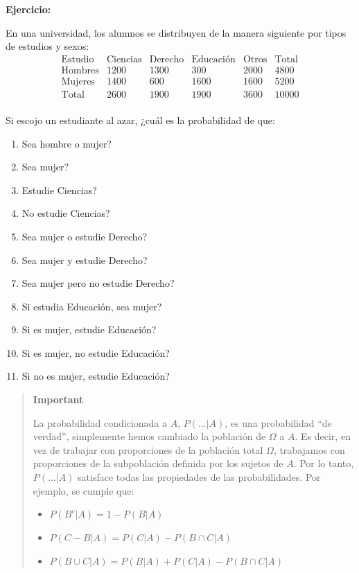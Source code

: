 \documentclass[
  spanish,
  letterpaper,
  DIV=11,
  numbers=noendperiod]{scrreprt}
\providecommand{\tightlist}{%
  \setlength{\itemsep}{0pt}\setlength{\parskip}{0pt}}
\begin{document}
\begin{tcolorbox}
\textbf{Ejercicio:}

En una universidad, los alumnos se distribuyen de la manera siguiente
por tipos de estudios y sexos: \[
\begin{array}{r|c|c|c|c|c}
\text{Estudio} & \text{Ciencias} & \text{Derecho} & \text{Educación} & \text{Otros} &  \text{Total}\\ \hline
\text{Hombres} & 1200 & 1300 &  300 & 2000 & 4800\\ \hline
\text{Mujeres} & 1400 & 600 & 1600 & 1600 & 5200\\ \hline
\text{Total} & 2600  &1900 & 1900 &  3600 & 10000\\  
\end{array}
\]

Si escojo un estudiante al azar, ¿cuál es la probabilidad de que:

\begin{enumerate}
\def\labelenumi{\alph{enumi}.}
\tightlist
\item
  Sea hombre o mujer?
\item
  Sea mujer?
\item
  Estudie Ciencias?
\item
  No estudie Ciencias?
\item
  Sea mujer o estudie Derecho?
\item
  Sea mujer y estudie Derecho?
\item
  Sea mujer pero no estudie Derecho?
\item
  Si estudia Educación, sea mujer?
\item
  Si es mujer, estudie Educación?
\item
  Si es mujer, no estudie Educación?
\item
  Si no es mujer, estudie Educación?
\end{enumerate}

\begin{quote}
\textbf{Important}

La probabilidad condicionada a \(A\), \(P(\ldots|A)\), es una
probabilidad ``de verdad'', simplemente hemos cambiado la población de
\(\Omega\) a \(A\). Es decir, en vez de trabajar con proporciones de la
población total \(\Omega\), trabajamos con proporciones de la
subpoblación definida por los sujetos de \(A\). Por lo tanto,
\(P(\ldots |A)\) satisface todas las propiedades de las probabilidades.
Por ejemplo, se cumple que:

\begin{itemize}
\tightlist
\item
  \(P(B^c|A)=1-P(B|A)\)
\item
  \(P(C-B|A)=P(C|A)-P(B\cap C|A)\)
\item
  \(P(B\cup C|A)=P(B|A)+P(C|A)-P(B\cap C|A)\)
\end{itemize}
\end{quote}


\end{tcolorbox}
\end{document}
